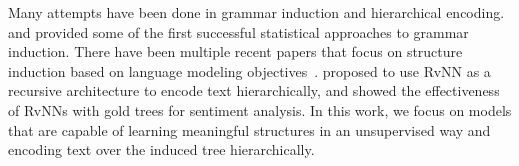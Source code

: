 

Many attempts have been done in grammar induction and hierarchical encoding. \citet{DBLP:conf/conll/Clark01} and \citet{DBLP:conf/acl/KleinM02}
provided some of the first successful statistical approaches to grammar induction. There have been multiple recent papers that focus on structure induction based on language modeling objectives~\cite{DBLP:conf/nips/ShenTHLSC19,DBLP:conf/iclr/ShenTSC19,DBLP:conf/acl/ShenTZBMC20,kim-etal-2019-compound}.  proposed to use RvNN as a recursive architecture to encode text hierarchically, and  showed the effectiveness of RvNNs with gold trees for sentiment analysis. In this work, we focus on models that are capable of learning meaningful structures in an unsupervised way and encoding text over the induced tree hierarchically.

